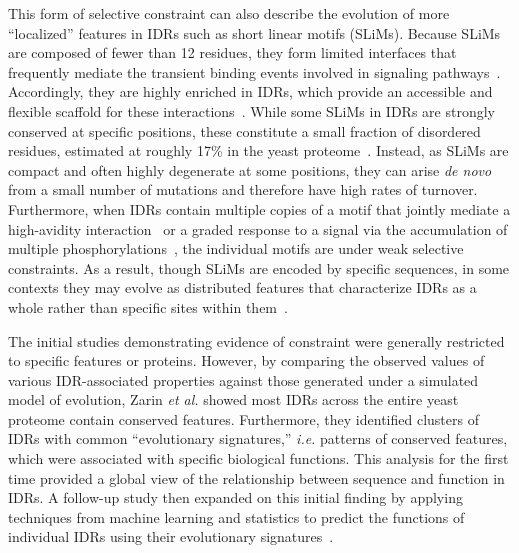 This form of selective constraint can also describe the evolution of more ``localized'' features in IDRs such as short linear motifs (SLiMs). Because SLiMs are composed of fewer than 12 residues, they form limited interfaces that frequently mediate the transient binding events involved in signaling pathways~\cite{Tompa2014}. Accordingly, they are highly enriched in IDRs, which provide an accessible and flexible scaffold for these interactions~\cite{Fuxreiter2007, Davey2012}. While some SLiMs in IDRs are strongly conserved at specific positions, these constitute a small fraction of disordered residues, estimated at roughly 17\% in the yeast proteome~\cite{NguyenBa2012}. Instead, as SLiMs are compact and often highly degenerate at some positions, they can arise \textit{de novo} from a small number of mutations and therefore have high rates of turnover. Furthermore, when IDRs contain multiple copies of a motif that jointly mediate a high-avidity interaction~\cite{Tompa2014} or a graded response to a signal via the accumulation of multiple phosphorylations~\cite{VanRoey2012, Wright2014}, the individual motifs are under weak selective constraints. As a result, though SLiMs are encoded by specific sequences, in some contexts they may evolve as distributed features that characterize IDRs as a whole rather than specific sites within them~\cite{Tan2010}.

The initial studies demonstrating evidence of constraint were generally restricted to specific features or proteins. However, by comparing the observed values of various IDR-associated properties against those generated under a simulated model of evolution, Zarin \textit{et al.} showed most IDRs across the entire yeast proteome contain conserved features. Furthermore, they identified clusters of IDRs with common ``evolutionary signatures,'' \textit{i.e.} patterns of conserved features, which were associated with specific biological functions. This analysis for the first time provided a global view of the relationship between sequence and function in IDRs. A follow-up study then expanded on this initial finding by applying techniques from machine learning and statistics to predict the functions of individual IDRs using their evolutionary signatures~\cite{Zarin2021}.

